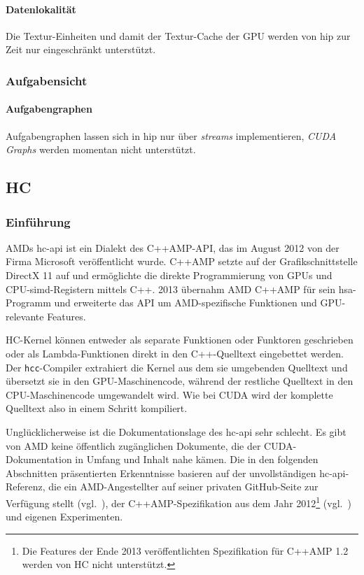 \paragraph{Datenlokalität}

Die Textur-Einheiten und damit der Textur-Cache der GPU werden von \gls{hip} zur
Zeit nur eingeschränkt unterstützt.

\subsubsection{Aufgabensicht}

\paragraph{Aufgabengraphen}

Aufgabengraphen lassen sich in \gls{hip} nur über \textit{streams}
implementieren, \textit{CUDA Graphs} werden momentan nicht unterstützt.

\subsection{HC}
\label{vergleich:hc}

\subsubsection{Einführung}

AMDs \gls{hc}-\gls{api} ist ein Dialekt des C++AMP-API, das im August 2012 von
der Firma Microsoft veröffentlicht wurde. C++AMP setzte auf der
Grafikschnittstelle DirectX 11 auf und ermöglichte die direkte Programmierung
von GPUs und CPU-\gls{simd}-Registern mittels C++. 2013 übernahm AMD C++AMP
für sein \gls{hsa}-Programm und erweiterte das API um AMD-spezifische Funktionen
und GPU-relevante Features.

HC-Kernel können entweder als separate Funktionen oder Funktoren geschrieben 
oder als Lambda-Funktionen direkt in den C++-Quelltext eingebettet werden. Der
\texttt{hcc}-Compiler extrahiert die Kernel aus dem sie umgebenden Quelltext
und übersetzt sie in den GPU-Maschinencode, während der restliche Quelltext
in den CPU-Maschinencode umgewandelt wird. Wie bei CUDA wird der komplette
Quelltext also in einem Schritt kompiliert.

Unglücklicherweise ist die Dokumentationslage des \gls{hc}-\gls{api} sehr
schlecht. Es gibt von AMD keine öffentlich zugänglichen Dokumente, die der
CUDA-Dokumentation in Umfang und Inhalt nahe kämen. Die in den folgenden
Abschnitten präsentierten Erkenntnisse basieren auf der unvollständigen
\gls{hc}-\gls{api}-Referenz, die ein AMD-Angestellter auf seiner privaten
GitHub-Seite zur Verfügung stellt (vgl.~\cite{hcref}), der C++AMP-Spezifikation aus
dem Jahr 2012\footnote{Die Features der Ende 2013 veröffentlichten Spezifikation
für C++AMP 1.2 werden von HC nicht unterstützt.} (vgl.~\cite{cppamp2012}) und
eigenen Experimenten.

